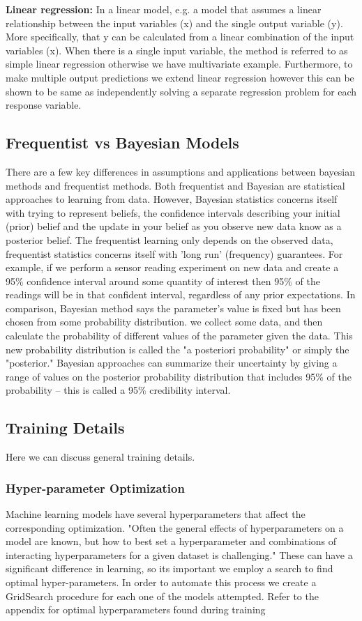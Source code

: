 \documentclass[journal,twoside,web]{ieeecolor}
\begin{document}
\textbf{Linear regression: } In a linear model, e.g. a model that assumes a linear relationship between the input variables (x) and the single output variable (y). More specifically, that y can be calculated from a linear combination of the input variables (x). When there is a single input variable, the method is referred to as simple linear regression otherwise we have multivariate example. Furthermore, to make multiple output predictions we extend linear regression however this can be shown to be same as independently solving a separate regression problem for each response variable.



\subsection{Frequentist vs Bayesian Models}
There are a few key differences in assumptions and applications between bayesian methods and frequentist methods. Both frequentist and Bayesian are statistical approaches to learning from data. However, Bayesian statistics concerns itself with trying to represent beliefs, the confidence intervals describing your initial (prior) belief and the update in your belief as you observe new data know as a posterior belief.
The frequentist learning only depends on the observed data, frequentist statistics concerns itself with 'long run' (frequency) guarantees. For example, if we perform a sensor reading experiment on new data and create a 95\% confidence interval around some quantity of interest then 95\% of the readings will be in that confident interval, regardless of any prior expectations. 
In comparison, Bayesian method says the parameter's value is fixed but has been chosen from some probability distribution. we collect some data, and then calculate the probability of different values of the parameter given the data. This new probability distribution is called the "a posteriori probability" or simply the "posterior." Bayesian approaches can summarize their uncertainty by giving a range of values on the posterior probability distribution that includes 95\% of the probability -- this is called a 95\% credibility interval.

\subsection{Training Details}
Here we can discuss general training details.

\subsubsection{Hyper-parameter Optimization}
{Machine learning models have several hyperparameters that affect the corresponding optimization. "Often the general effects of hyperparameters on a model are known, but how to best set a hyperparameter and combinations of interacting hyperparameters for a given dataset is challenging."
These can have a significant difference in learning, so its important we employ a search to find optimal hyper-parameters. In order to automate this process we create a GridSearch procedure for each one of the models attempted.  Refer to the appendix for optimal hyperparameters  found during training }
\end{document}
